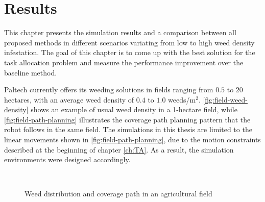 \chapter{Results}\label{ch:Results}
This chapter presents the simulation results and a comparison between all proposed methods in different scenarios variating from low to high weed density infestation. The goal of this chapter is to come up with the best solution for the task allocation problem and measure the performance improvement over the baseline method.

Paltech currently offers its weeding solutions in fields ranging from $0.5$ to $20$ hectares, with an average weed density of $0.4$ to $1.0$ weeds/m$^2$. \autoref{fig:field-weed-density} shows an example of usual weed density in a 1-hectare field, while \autoref{fig:field-path-planning} illustrates the coverage path planning pattern that the robot follows in the same field. The simulations in this thesis are limited to the linear movements shown in \ref{fig:field-path-planning}, due to the motion constraints described at the beginning of chapter \ref{ch:TA}. As a result, the simulation environments were designed accordingly.

\begin{figure}[htb]
    \myfloatalign
     \quad
     \\
    \caption{Weed distribution and coverage path in an agricultural field}\label{fig:usual-field-example}
\end{figure}

